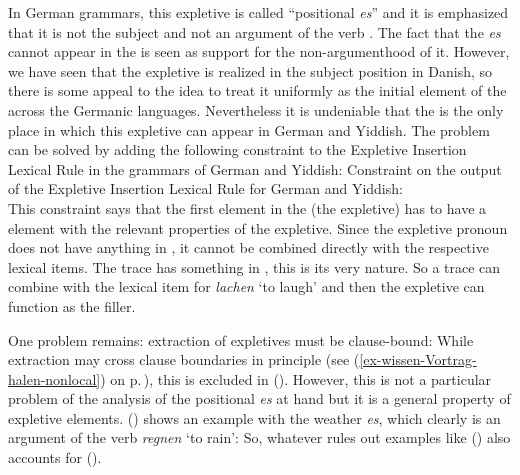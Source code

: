 \eal
{}
\zl
In German grammars, this expletive is called ``positional \emph{es}'' and it is emphasized that it is
not the subject and not an argument of the verb \parencites[, 177, 371]{Eisenberg2004a}[§1263]{Duden2005-Authors}. The fact that the \emph{es} cannot appear in the
\mf is seen as support for the non-argumenthood of it. However, we have seen that the expletive is
realized in the subject position in Danish, so there is some appeal to the idea to treat it
uniformly as the initial element of the \argstl across the Germanic languages. Nevertheless it is
undeniable that the \vf is the only place in which this expletive can appear in German and Yiddish.  
The problem can be solved by adding the following constraint to the Expletive Insertion Lexical Rule
in the grammars of German and Yiddish:
\ea
Constraint on the output of the Expletive Insertion Lexical Rule for German and Yiddish:\\
\z
This constraint says that the first element in the \argstl (the expletive) has to have a \slasch
element with the relevant properties of the expletive. Since the expletive pronoun does not have
anything in \slasch, it cannot be combined directly with the respective lexical items. The trace has
something in \slasch, this is its very nature. So a trace can combine with the lexical item for
\emph{lachen} `to laugh' and then the expletive can function as the filler.

One problem remains: extraction of expletives must be clause-bound:
\z
While extraction may cross clause boundaries in principle (see
(\ref{ex-wissen-Vortrag-halen-nonlocal}) on p.\,\pageref{ex-wissen-Vortrag-halen-nonlocal}), this is excluded in
(). However, this is not a particular problem of the analysis of the positional \emph{es} at
hand but it is a general property of expletive elements. () shows an example with the weather
\emph{es}, which clearly is an argument of the verb \emph{regnen} `to rain':
\z
So, whatever rules out examples like () also accounts for ().


